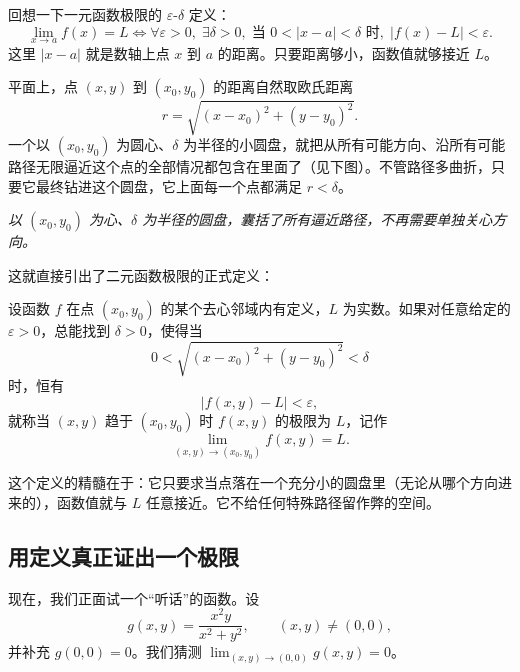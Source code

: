 回想一下一元函数极限的 \(\varepsilon\)-\(\delta\) 定义：
\[
\lim_{x\to a}f(x)=L \iff \forall\varepsilon>0,\;\exists\delta>0,\; \text{当 }0<|x-a|<\delta \text{ 时},\; |f(x)-L|<\varepsilon.
\]
这里 \(|x-a|\) 就是数轴上点 \(x\) 到 \(a\) 的距离。只要距离够小，函数值就够接近 \(L\)。

平面上，点 \((x,y)\) 到 \((x_0,y_0)\) 的距离自然取欧氏距离
\[
r=\sqrt{(x-x_0)^2+(y-y_0)^2}.
\]
一个以 \((x_0,y_0)\) 为圆心、\(\delta\) 为半径的小圆盘，就把从所有可能方向、沿所有可能路径无限逼近这个点的全部情况都包含在里面了（见下图）。不管路径多曲折，只要它最终钻进这个圆盘，它上面每一个点都满足 \(r<\delta\)。

\begin{center}

\emph{以 \((x_0,y_0)\) 为心、\(\delta\) 为半径的圆盘，囊括了所有逼近路径，不再需要单独关心方向。}
\end{center}

这就直接引出了二元函数极限的正式定义：

\begin{definition}[二元函数的极限]
设函数 \(f\) 在点 \((x_0,y_0)\) 的某个去心邻域内有定义，\(L\) 为实数。如果对任意给定的 \(\varepsilon>0\)，总能找到 \(\delta>0\)，使得当
\[
0<\sqrt{(x-x_0)^2+(y-y_0)^2}<\delta
\]
时，恒有
\[
|f(x,y)-L|<\varepsilon,
\]
就称当 \((x,y)\) 趋于 \((x_0,y_0)\) 时 \(f(x,y)\) 的极限为 \(L\)，记作
\[
\lim_{(x,y)\to(x_0,y_0)}f(x,y)=L.
\]
\end{definition}

这个定义的精髓在于：它只要求当点落在一个充分小的圆盘里（无论从哪个方向进来的），函数值就与 \(L\) 任意接近。它不给任何特殊路径留作弊的空间。

\subsection{用定义真正证出一个极限}

现在，我们正面试一个``听话''的函数。设
\[
g(x,y)=\frac{x^2y}{x^2+y^2},\qquad (x,y)\neq(0,0),
\]
并补充 \(g(0,0)=0\)。我们猜测 \(\displaystyle\lim_{(x,y)\to(0,0)}g(x,y)=0\)。

